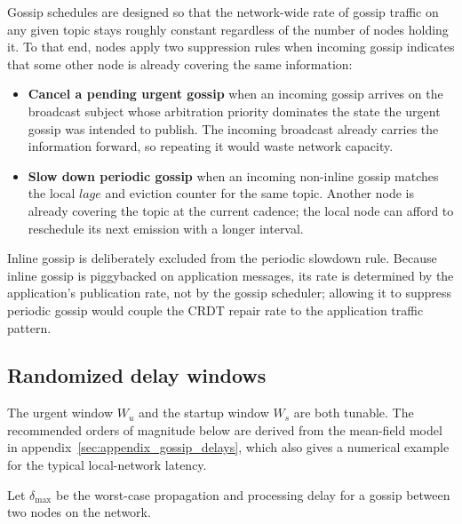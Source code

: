 Gossip schedules are designed so that the network-wide rate of gossip traffic on
any given topic stays roughly constant regardless of the number of nodes holding
it. To that end, nodes apply two suppression rules when incoming gossip indicates
that some other node is already covering the same information:

\begin{itemize}
    \item \textbf{Cancel a pending urgent gossip} when an incoming gossip arrives
    on the broadcast subject whose arbitration priority dominates the state the
    urgent gossip was intended to publish. The incoming broadcast already
    carries the information forward, so repeating it would waste network
    capacity.

    \item \textbf{Slow down periodic gossip} when an incoming non-inline gossip
    matches the local $\mathit{lage}$ and eviction counter for the same topic.
    Another node is already covering the topic at the current cadence; the
    local node can afford to reschedule its next emission with a longer
    interval.
\end{itemize}

\begin{remark}
    Inline gossip is deliberately excluded from the periodic slowdown rule.
    Because inline gossip is piggybacked on application messages, its rate is
    determined by the application's publication rate, not by the gossip
    scheduler; allowing it to suppress periodic gossip would couple the CRDT
    repair rate to the application traffic pattern.
\end{remark}

\subsection{Randomized delay windows}\label{sec:session_gossip_delays}

The urgent window $W_u$ and the startup window $W_s$ are both tunable. The
recommended orders of magnitude below are derived from the mean-field model
in appendix~\ref{sec:appendix_gossip_delays}, which also gives a numerical
example for the typical local-network latency.

Let $\delta_{\max}$ be the worst-case propagation and processing delay for a
gossip between two nodes on the network.

